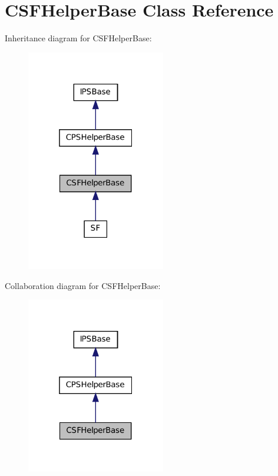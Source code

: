 \hypertarget{classCSFHelperBase}{
\section{CSFHelperBase Class Reference}
\label{classCSFHelperBase}
}


Inheritance diagram for CSFHelperBase:\nopagebreak
\begin{figure}[H]
\begin{center}
\leavevmode
\includegraphics[width=172pt]{classCSFHelperBase__inherit__graph}
\end{center}
\end{figure}


Collaboration diagram for CSFHelperBase:\nopagebreak
\begin{figure}[H]
\begin{center}
\leavevmode
\includegraphics[width=172pt]{classCSFHelperBase__coll__graph}
\end{center}
\end{figure}
